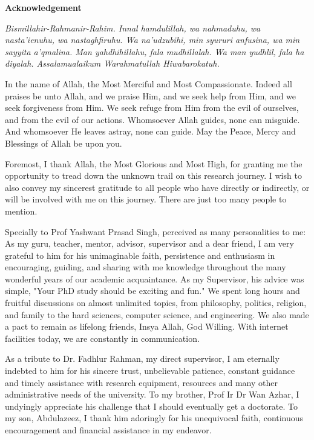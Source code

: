 \justifying
\vspace*{4\baselineskip}
{\LARGE\bfseries 
	Acknowledgement\\
} 

\begin{tcolorbox}
\justifying
\textit{Bismillahir-Rahmanir-Rahim. Innal hamdulillah, wa nahmaduhu, wa nasta'ienuhu, wa nastaghfiruhu. Wa na'udzubihi, min syururi anfusina, wa min sayyita a'qmalina. Man yahdhihillahu, fala mudhillalah. Wa man yudhlil, fala ha diyalah. Assalamualaikum Warahmatullah Hiwabarokatuh.}
\vspace{0.5cm}

In the name of Allah, the Most Merciful and Most Compassionate. Indeed all praises be unto Allah, and we praise Him, and we seek help from Him, and we seek forgiveness from Him. We seek refuge from Him from the evil of ourselves, and from the evil of our actions. Whomsoever Allah guides, none can misguide. And whomsoever He leaves astray, none can guide. May the Peace, Mercy and Blessings of Allah be upon you.  
\end{tcolorbox} 

Foremost, I thank Allah, the Most Glorious and Most High, for granting me the opportunity to tread down the unknown trail on this research journey. I wish to also convey my sincerest gratitude to all people who have directly or indirectly, or will be involved with me on this journey. There are just too many people to mention.   
\vspace*{1\baselineskip}
 
Specially to Prof Yashwant Prasad Singh, perceived as many personalities to me: As my guru, teacher, mentor, advisor, supervisor and a dear friend, I am very grateful to him for his unimaginable faith, persistence and enthusiasm in encouraging, guiding, and sharing with me knowledge throughout the many wonderful years of our academic acquaintance. As my Supervisor, his advice was simple, "Your PhD study should be exciting and fun." We spent long hours and fruitful discussions on almost unlimited topics, from philosophy, politics, religion, and family to the hard sciences, computer science, and engineering. We also made a pact to remain as lifelong friends, Insya Allah, God Willing. With internet facilities today, we are constantly in communication.
\vspace*{1\baselineskip}

As a tribute to Dr. Fadhlur Rahman, my direct supervisor, I am eternally indebted to him for his sincere trust, unbelievable patience, constant guidance and timely assistance with research equipment, resources and many other administrative needs of the university. To my brother, Prof Ir Dr Wan Azhar, I undyingly appreciate his challenge that I should eventually get a doctorate. To my son, Abdulazeez, I thank him adoringly for his unequivocal faith, continuous encouragement and financial assistance in my endeavor.
\vspace*{1\baselineskip}
  
